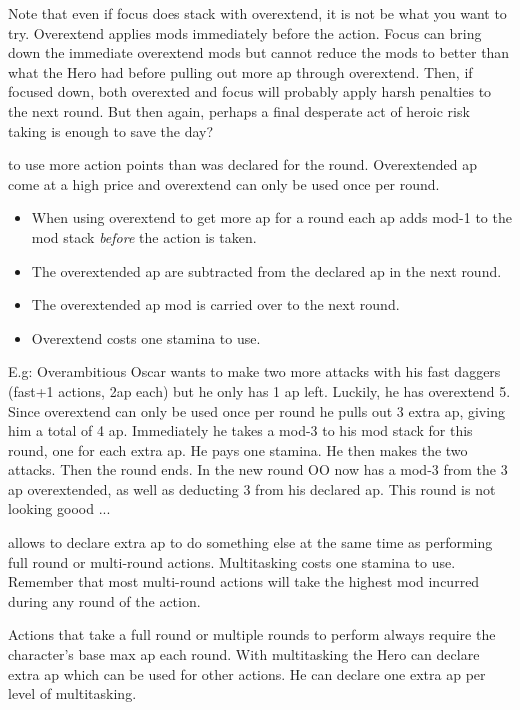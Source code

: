 Note that even if focus does stack with overextend, it is not be what you want to try. Overextend applies mods immediately before the action. Focus can bring down the immediate overextend mods but cannot reduce the mods to better than what the Hero had before pulling out more ap through overextend. Then, if focused down, both overexted and focus will probably apply harsh penalties to the next round. But then again, perhaps a final desperate act of heroic risk taking is enough to save the day?


 to use more action points than was declared for the round. Overextended ap come at a high price and overextend can only be used once per round.
\begin{itemize}
    \item When using overextend to get more ap for a round each ap adds mod-1 to the mod stack \emph{before} the action is taken.
    \item The overextended ap are subtracted from the declared ap in the next round.
    \item The overextended ap mod is carried over to the next round.
    \item Overextend costs one stamina to use.
\end{itemize}

E.g: Overambitious Oscar wants to make two more attacks with his fast daggers (fast+1 actions, 2ap each) but he only has 1 ap left. Luckily, he has overextend 5. Since overextend can only be used once per round he pulls out 3 extra ap, giving him a total of 4 ap. Immediately he takes a mod-3 to his mod stack for this round, one for each extra ap. He pays one stamina. He then makes the two attacks. Then the round ends. In the new round OO now has a mod-3 from the 3 ap overextended, as well as deducting 3 from his declared ap. This round is not looking goood ...


 allows to declare extra ap to do something else at the same time as performing full round or multi-round actions. Multitasking costs one stamina to use. Remember that most multi-round actions will take the highest mod incurred during any round of the action.

Actions that take a full round or multiple rounds to perform always require the character's base max ap each round. With multitasking the Hero can declare extra ap which can be used for other actions. He can declare one extra ap per level of multitasking.

